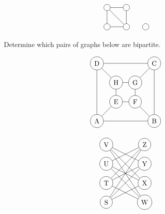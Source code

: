 \documentclass[12pt]{article}
\newenvironment{question}[2][Question]{\begin{trivlist}
\item[\hskip \labelsep {\bfseries #1}\hskip \labelsep {\bfseries #2.}]}{\end{trivlist}}
\begin{document}
\begin{align*}
\begin{tikzpicture}
\node[shape=circle,draw=black] (A) at (0,0) {};
\node[shape=circle,draw=black] (B) at (1,0) {};
\node[shape=circle,draw=black] (C) at (0,-1) {};
\node[shape=circle,draw=black] (D) at (1,-1) {};
\node[shape=circle,draw=black] (E) at (2,-1) {};
\path [] (A) edge node[left] {} (B);
\path [] (B) edge node[left] {} (D);
\path [] (D) edge node[left] {} (C);
\path [] (A) edge node[left] {} (C);
\path [] (D) edge node[left] {} (A);
\end{tikzpicture}
\end{align*}

\begin{question}{3}
	Determine which pairs of graphs below are bipartite.
	
	
	\begin{align*}
	\begin{tikzpicture}
	\node[shape=circle,draw=black] (A) at (0,-3) {A};
	\node[shape=circle,draw=black] (B) at (3,-3) {B};
	\node[shape=circle,draw=black] (C) at (3,0) {C};
	\node[shape=circle,draw=black] (D) at (0,0) {D};
	\node[shape=circle,draw=black] (E) at (1,-2) {E};
	\node[shape=circle,draw=black] (F) at (2,-2) {F};
	\node[shape=circle,draw=black] (G) at (2,-1) {G};
	\node[shape=circle,draw=black] (H) at (1,-1) {H};
	\path [] (D) edge node[left] {} (A);
	\path [] (A) edge node[left] {} (B);
	\path [] (B) edge node[left] {} (C);
	\path [] (C) edge node[left] {} (D);
	\path [] (E) edge node[left] {} (F);
	\path [] (F) edge node[left] {} (G);
	\path [] (G) edge node[left] {} (H);
	\path [] (H) edge node[left] {} (E);
	\path [] (A) edge node[left] {} (E);
	\path [] (B) edge node[left] {} (F);
	\path [] (G) edge node[left] {} (C);
	\path [] (D) edge node[left] {} (H);
	\end{tikzpicture}
	\end{align*}
	
	\begin{align*}
	\begin{tikzpicture}
	\node[shape=circle,draw=black] (S) at (0,0) {S};
	\node[shape=circle,draw=black] (T) at (0,1) {T};
	\node[shape=circle,draw=black] (U) at (0,2) {U};
	\node[shape=circle,draw=black] (V) at (0,3) {V};
	\node[shape=circle,draw=black] (W) at (2,0) {W};
	\node[shape=circle,draw=black] (X) at (2,1) {X};
	\node[shape=circle,draw=black] (Y) at (2,2) {Y};
	\node[shape=circle,draw=black] (Z) at (2,3) {Z};
	\path [] (S) edge node[left] {} (Z);
	\path [] (S) edge node[left] {} (Y);
	\path [] (S) edge node[left] {} (X);
	\path [] (T) edge node[left] {} (Z);
	\path [] (T) edge node[left] {} (Y);
	\path [] (T) edge node[left] {} (W);
	\path [] (U) edge node[left] {} (Z);
	\path [] (U) edge node[left] {} (X);
	\path [] (U) edge node[left] {} (W);
	\path [] (V) edge node[left] {} (Y);
	\path [] (V) edge node[left] {} (X);
	\path [] (V) edge node[left] {} (W);
	\end{tikzpicture}
	\end{align*}
	
\end{question}
	
\end{document}
